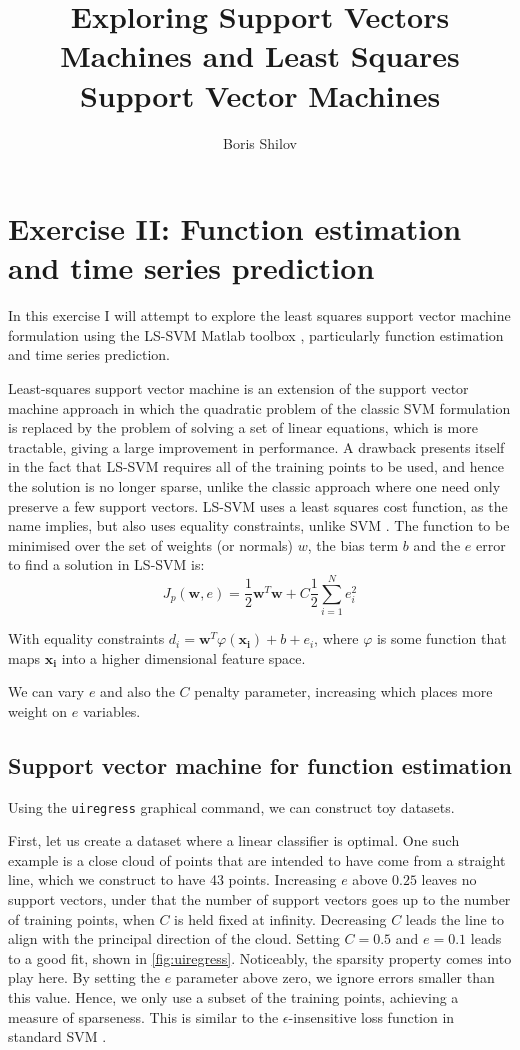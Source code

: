 \documentclass[10pt,a4paper]{article}
\title{Exploring Support Vectors Machines and Least Squares Support Vector Machines}
\author{Boris Shilov}
\begin{document}
\maketitle
\section{Exercise II: Function estimation and time series prediction}

In this exercise I will attempt to explore the least squares support vector machine formulation using the LS-SVM Matlab toolbox \cite{pelckmansLSSVMlabMATLABToolbox}, particularly function estimation and time series prediction. 

Least-squares support vector machine is an extension of the support vector machine approach in which the quadratic problem of the classic SVM formulation is replaced by the problem of solving a set of linear equations, which is more tractable, giving a large improvement in performance. A drawback presents itself in the fact that LS-SVM requires all of the training points to be used, and hence the solution is no longer sparse, unlike the classic approach where one need only preserve a few support vectors. LS-SVM uses a least squares cost function, as the name implies, but also uses equality constraints, unlike SVM \cite{valyonRobustLSSVMRegression2007}. The function to be minimised over the set of weights (or normals) $w$, the bias term $b$ and the $e$ error to find a solution in LS-SVM is:
$$
J_p(\mathbf{w}, e) = \frac{1}{2}\mathbf{w}^T\mathbf{w} + C \frac{1}{2} \sum^N_{i=1}{e^2_i}
$$

With equality constraints $d_i = \mathbf{w}^T\varphi(\mathbf{x_i}) + b + e_i$, where $\varphi$ is some function that maps $\mathbf{x_i}$ into a higher dimensional feature space.

We can vary $e$ and also the $C$ penalty parameter, increasing which places more weight on $e$ variables.

\subsection{Support vector machine for function estimation}
Using the \texttt{uiregress} graphical command, we can construct toy datasets. 

First, let us create a dataset where a linear classifier is optimal. One such example is a close cloud of points that are intended to have come from a straight line, which we construct to have 43 points. Increasing $e$ above $0.25$ leaves no support vectors, under that the number of support vectors goes up to the number of training points, when $C$ is held fixed at infinity. Decreasing $C$ leads the line to align with the principal direction of the cloud. Setting $C=0.5$ and $e=0.1$ leads to a good fit, shown in \ref{fig:uiregress}. Noticeably, the sparsity property comes into play here. By setting the $e$ parameter above zero, we ignore errors smaller than this value. Hence, we only use a subset of the training points, achieving a measure of sparseness. This is similar to the $\epsilon$-insensitive loss function in standard SVM \cite{valyonRobustLSSVMRegression2007}.
\end{document}
